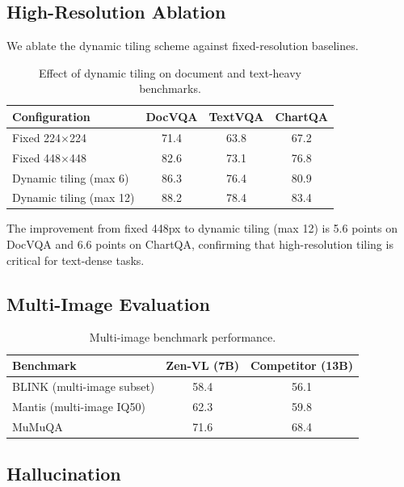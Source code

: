 \documentclass[11pt,a4paper]{article}
\begin{document}
\subsection{High-Resolution Ablation}

We ablate the dynamic tiling scheme against fixed-resolution baselines.

\begin{table}[H]
\centering
\caption{Effect of dynamic tiling on document and text-heavy benchmarks.}
\label{tab:tiling_ablation}
\begin{tabular}{lccc}
\toprule
\textbf{Configuration} & \textbf{DocVQA} & \textbf{TextVQA} & \textbf{ChartQA} \\
\midrule
Fixed 224$\times$224       & 71.4 & 63.8 & 67.2 \\
Fixed 448$\times$448       & 82.6 & 73.1 & 76.8 \\
Dynamic tiling (max 6)     & 86.3 & 76.4 & 80.9 \\
Dynamic tiling (max 12)    & 88.2 & 78.4 & 83.4 \\
\bottomrule
\end{tabular}
\end{table}

The improvement from fixed 448px to dynamic tiling (max 12) is 5.6 points on DocVQA and 6.6
points on ChartQA, confirming that high-resolution tiling is critical for text-dense tasks.

\subsection{Multi-Image Evaluation}

\begin{table}[H]
\centering
\caption{Multi-image benchmark performance.}
\label{tab:multi_image}
\begin{tabular}{lcc}
\toprule
\textbf{Benchmark} & \textbf{Zen-VL (7B)} & \textbf{Competitor (13B)} \\
\midrule
BLINK (multi-image subset) & 58.4 & 56.1 \\
Mantis (multi-image IQ50) & 62.3 & 59.8 \\
MuMuQA                     & 71.6 & 68.4 \\
\bottomrule
\end{tabular}
\end{table}

\subsection{Hallucination}
\end{document}
